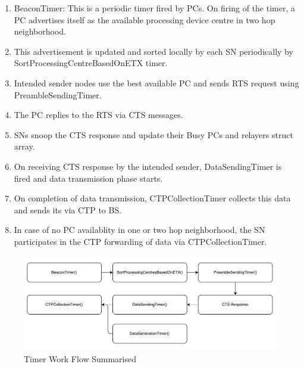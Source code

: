 	\begin{enumerate}
	    \item BeaconTimer: This is a periodic timer fired by \acp{PC}. On firing of the timer, a \ac{PC} advertises itself as the available processing device centre in two hop neighborhood.
	    
	    \item This advertisement is updated and sorted locally by each \ac{SN} periodically by SortProcessingCentreBasedOnETX timer.
	    
	    \item Intended sender nodes use the best available \ac{PC} and sends \ac{RTS} request using PreambleSendingTimer.
	    
	    \item The \ac{PC} replies to the \ac{RTS} via \ac{CTS} messages.
	    
	    \item \acp{SN} snoop the \ac{CTS} response and update their Busy \acp{PC} and relayers struct array.
	    
	    \item On receiving \ac{CTS} response by the intended sender, DataSendingTimer is fired and data transmission phase starts.
	    
	    \item On completion of data transmission, CTPCollectionTimer collects this data and sends its via \ac{CTP} to \ac{BS}.
	    
	    \item In case of no \ac{PC} availablity in one or two hop neighborhood, the \ac{SN} participates in the \ac{CTP} forwarding of data via CTPCollectionTimer.
	\end{enumerate}
	
	\begin{figure}
    \centering
    \includegraphics[width=1.0\textwidth]{gfx/TimerWorkflowSummarised.pdf}
    \caption{Timer Work Flow Summarised}
    \label{fig:TimerWorkflowSummarised}
    \end{figure}
	
